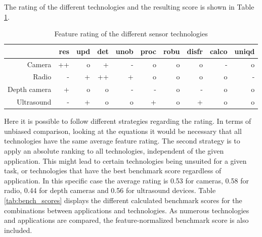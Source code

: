 The rating of the different technologies and the resulting score is shown in Table \ref{tab:bench_feature_rating}.

\begin{table}[htbp]
  \centering
  \caption{Feature rating of the different sensor technologies}
    \begin{tabular}{rrrrrrrrrr}
    \toprule
          & res   & upd   & det   & unob  & proc  & robu  & disfr & calco & uniqd \\
    \midrule
    Camera & ++    & o     & +     & -     & o     & o     & o     & -     & o \\
    Radio & -     & +     & ++    & +     & o     & o     & o     & o     & - \\
    Depth camera & +     & o     & o     & -     & -     & o     & -     & o     & o \\
    Ultrasound & -     & +     & o     & o     & +     & o     & +     & o     & o \\
    \bottomrule
    \end{tabular}
  \label{tab:bench_feature_rating}
\end{table}

Here it is possible to follow different strategies regarding the rating. In terms of unbiased comparison, looking at the equations it would be necessary that all technologies have the same average feature rating. The second strategy is to apply an absolute ranking to all technologies, independent of the given application. This might lead to certain technologies being unsuited for a given task, or technologies that have the best benchmark score regardless of application. In this specific case the average rating is 0.53 for cameras, 0.58 for radio, 0.44 for depth cameras and 0.56 for ultrasound devices. Table \ref{tab:bench_scores} displays the different calculated benchmark scores for the combinations between applications and technologies. As numerous technologies and applications are compared, the feature-normalized benchmark score is also included.


